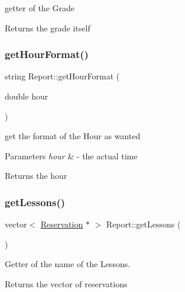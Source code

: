 getter of the Grade 

\begin{DoxyReturn}{Returns}
the grade itself 
\end{DoxyReturn}
\mbox{\label{class_report_ac47731e5f3f0f22574223a2a9e5688b5}} 
\subsubsection{\texorpdfstring{get\+Hour\+Format()}{getHourFormat()}}
{\footnotesize\ttfamily string Report\+::get\+Hour\+Format (\begin{DoxyParamCaption}\item[{double}]{hour }\end{DoxyParamCaption})}



get the format of the Hour as wanted 


\begin{DoxyParams}{Parameters}
{\em hour} & -\/ the actual time \\
\hline
\end{DoxyParams}
\begin{DoxyReturn}{Returns}
the hour 
\end{DoxyReturn}
\mbox{\label{class_report_a2915547d50dfefb1eae33f12ed0942d8}} 
\subsubsection{\texorpdfstring{get\+Lessons()}{getLessons()}}
{\footnotesize\ttfamily vector$<$ \mbox{\hyperlink{class_reservation}{Reservation}} $\ast$ $>$ Report\+::get\+Lessons (\begin{DoxyParamCaption}{ }\end{DoxyParamCaption})}



Getter of the name of the Lessons. 

\begin{DoxyReturn}{Returns}
the vector of reservations 
\end{DoxyReturn}
\mbox{\label{class_report_aaeac48b6c10c5bbf240fc518b6d45d05}} 
